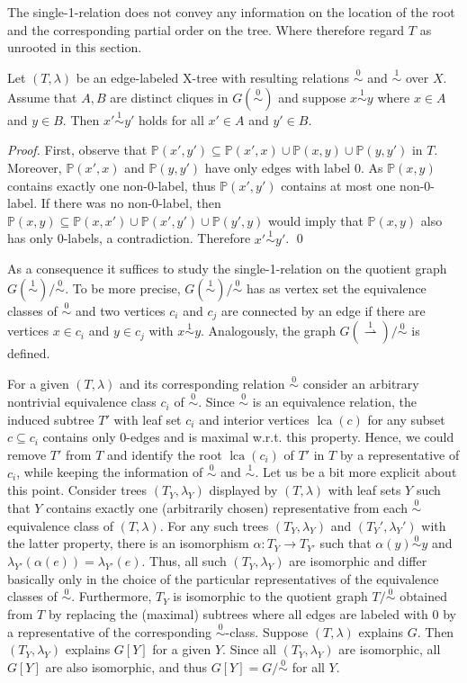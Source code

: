 \documentclass[smallextended]{svjour3}
\newcommand{\Ro}{\mathrel{\overset{0}{\sim}}}
\newcommand{\Rl}{\mathrel{\overset{1}{\sim}}}
\newcommand{\Rld}{\mathrel{\overset{1}{\rightharpoonup}}}
\newcommand{\lca}[1]{\mathop{lca}(#1)}
\begin{document}
The single-1-relation does not convey any information on the location of
the root and the corresponding partial order on the tree. Where therefore
regard $T$ as unrooted in this section.

\begin{lemma}
  \label{lem:notriangle}
  Let $(T,\lambda)$ be an edge-labeled X-tree with resulting relations
  $\Ro$ and $\Rl$ over $X$.  Assume that $A,B$ are distinct cliques in
  $G(\Ro)$ and suppose $x\Rl y$ where $x\in A$ and $y\in B$. Then $x'\Rl
  y'$ holds for all $x'\in A$ and $y'\in B$.
\end{lemma}
\begin{proof}
  First, observe that $\mathbb{P}(x',y') \subseteq
  \mathbb{P}(x',x)\cup \mathbb{P}(x,y)\cup \mathbb{P}(y,y')$ in $T$. 
  Moreover,  $\mathbb{P}(x',x)$ and $\mathbb{P}(y,y')$ have only edges with 
  label $0$. As $\mathbb{P}(x,y)$ contains exactly one non-0-label, thus 
  $\mathbb{P}(x',y')$ contains at most one non-0-label. If there was 
  no non-0-label, then $\mathbb{P}(x,y) \subseteq
  \mathbb{P}(x,x')\cup \mathbb{P}(x',y')\cup \mathbb{P}(y',y)$ would imply 
  that $\mathbb{P}(x,y)$ also has only 0-labels, a contradiction. Therefore 
  $x'\Rl y'$. \qed
\end{proof}

As a consequence it suffices to study the single-1-relation on the quotient
graph $G(\Rl)/\Ro$. To be more precise, $G(\Rl)/\Ro$ has as vertex set the
equivalence classes of $\Ro$ and two vertices $c_i$ and $c_j$ are connected
by an edge if there are vertices $x\in c_i$ and $y\in c_j$ with $x\Rl
y$. Analogously, the graph $G(\Rld)/\Ro$ is defined.

  For a given $(T,\lambda)$ and its corresponding relation $\Ro$
  consider an arbitrary nontrivial equivalence class $c_i$ of $\Ro$. Since
  $\Ro$ is an equivalence relation, the induced subtree $T'$ with leaf set
  $c_i$ and interior vertices $\lca{c}$ for any subset $c\subseteq c_i$
  contains only 0-edges and is maximal w.r.t. this property. Hence, we
  could remove $T'$ from $T$ and identify the root $\lca{c_i}$ of $T'$ in
  $T$ by a representative of $c_i$, while keeping the information of $\Ro$
  and $\Rl$. Let us be a bit more explicit about this point. Consider trees
  $(T_Y,\lambda_Y)$ displayed by $(T,\lambda)$ with leaf sets $Y$ such that
  $Y$ contains exactly one (arbitrarily chosen) representative from each
  $\Ro$ equivalence class of $(T,\lambda)$.  For any such trees
  $(T_Y,\lambda_Y)$ and $(T_Y',\lambda_Y')$ with the latter property, there
  is an isomorphism $\alpha: T_Y\to T_{Y'}$ such that $\alpha(y)\Ro y$ and
  $\lambda_{Y'}(\alpha(e))=\lambda_{Y'}(e)$. Thus, all such
  $(T_Y,\lambda_Y)$ are isomorphic and differ basically only in the choice
  of the particular representatives of the equivalence classes of $\Ro$.
  Furthermore, $T_{Y}$ is isomorphic to the quotient graph $T/\Ro$ obtained
  from $T$ by replacing the (maximal) subtrees where all edges are labeled
  with $0$ by a representative of the corresponding $\Ro$-class.  Suppose
  $(T,\lambda)$ explains $G$. Then $(T_Y,\lambda_Y)$ explains $G[Y]$ for a
  given $Y$. Since all $(T_Y,\lambda_Y)$ are isomorphic, all $G[Y]$ are
  also isomorphic, and thus $G[Y]=G/\Ro$ for all $Y$.
  
\end{document}
